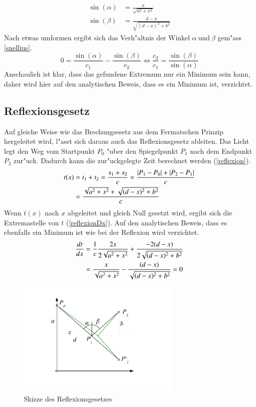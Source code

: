 \begin{align}
	\sin(\alpha) &= \frac{x}{\sqrt{a^2 + x^2}}  \label{substitution1}\\
	\sin(\beta) &= \frac{d-x}{\sqrt{(d -x)^2 + b^2}} \label{substitution2}
\end{align}
Nach etwas umformen ergibt sich das Verh"altnis der Winkel $\alpha \ \text{und} \ \beta$ gem"ass \eqref{snellius}.
\begin{equation}
	0 = \frac{\sin(\alpha)}{c_1} - \frac{\sin(\beta)}{c_2} \Leftrightarrow\frac{c_2}{c_1} = \frac{\sin(\beta)}{\sin(\alpha)}
	\label{snellius}
\end{equation}
Anschaulich ist klar, dass das gefundene Extremum nur ein Minimum
sein kann, daher
wird hier auf den analytischen Beweis, dass es ein Minimum ist, verzichtet.

\subsection{Reflexionsgesetz}
Auf gleiche Weise wie das Brechungsesetz aus dem Fermatschen Prinzip
hergeleitet wird, 
l"asst sich daraus auch das Reflexionsgesetz ableiten.
Das Licht legt den Weg vom Startpunkt $P_0$ "uber den Spiegelpunkt $P_1$ 
nach dem Endpunkt $P_2$ zur"uck. Dadurch kann die zur"uckgelegte Zeit
berechnet werden \cite{Wikipedia} (\eqref{reflexion}).
\begin{align}
t(x) &= t_1 + t_2 = \frac{s_1 + s_2}{c} = \frac{|P_1 - P_0| + |P_2 - P_1|}{c} \notag \\
&= \frac{\sqrt{a^2 + x^2} + \sqrt{(d-x)^2 + b^2}}{c} \label{reflexion}
\end{align}
Wenn $t(x)$ nach $x$ abgeleitet und gleich Null gesetzt wird, ergibt
sich die Extremastelle  von $t$ (\eqref{reflexionDx}).
Auf den analytischen Beweis, dass es ebenfalls ein Minimum ist wie bei
der Reflexion wird verzichtet.
\begin{align}
\frac{dt}{dx} &= \frac{1}{c}  \frac{2  x}{2  \sqrt{a^2 + x^2}} + \frac{-2  (d-x)}{2  \sqrt{(d-x)^2 + b^2}} \notag \\
&= \frac{x}{ \sqrt{a^2 + x^2}} - \frac{(d-x)}{ \sqrt{(d-x)^2 + b^2}} = 0 \label{reflexionDx}
\end{align}
\begin{figure}
\begin{center}
	\includegraphics[width=0.7\textwidth]{licht/picture/Spiegelung.pdf}
	\caption{Skizze des Reflexionsgesetzes}
	\label{Ab:spiegelung}
\end{center}
\end{figure}
